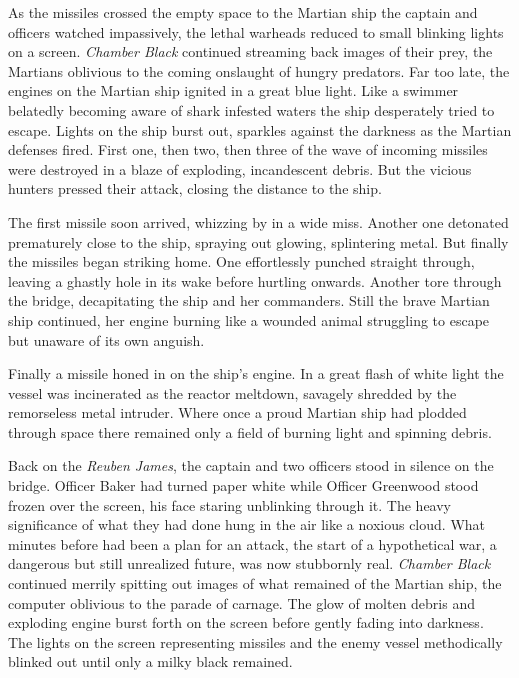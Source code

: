 \documentclass[openany, 12pt]{book} %
\begin{document}
As the missiles crossed the empty space to the Martian ship the captain and officers watched impassively, the lethal warheads reduced to small blinking lights on a screen. \textit{Chamber Black} continued streaming back images of their prey, the Martians oblivious to the coming onslaught of hungry predators. Far too late, the engines on the Martian ship ignited in a great blue light. Like a swimmer belatedly becoming aware of shark infested waters the ship desperately tried to escape. Lights on the ship burst out, sparkles against the darkness as the Martian defenses fired. First one, then two, then three of the wave of incoming missiles were destroyed in a blaze of exploding, incandescent debris. But the vicious hunters pressed their attack, closing the distance to the ship.

The first missile soon arrived, whizzing by in a wide miss. Another one detonated prematurely close to the ship, spraying out glowing, splintering metal. But finally the missiles began striking home. One effortlessly punched straight through, leaving a ghastly hole in its wake before hurtling onwards. Another tore through the bridge, decapitating the ship and her commanders. Still the brave Martian ship continued, her engine burning like a wounded animal struggling to escape but unaware of its own anguish.

Finally a missile honed in on the ship's engine. In a great flash of white light the vessel was incinerated as the reactor meltdown, savagely shredded by the remorseless metal intruder. Where once a proud Martian ship had plodded through space there remained only a field of burning light and spinning debris.

Back on the \textit{Reuben James}, the captain and two officers stood in silence on the bridge. Officer Baker had turned paper white while Officer Greenwood stood frozen over the screen, his face staring unblinking through it. The heavy significance of what they had done hung in the air like a noxious cloud. What minutes before had been a plan for an attack, the start of a hypothetical war, a dangerous but still unrealized future, was now stubbornly real. \textit{Chamber Black} continued merrily spitting out images of what remained of the Martian ship, the computer oblivious to the parade of carnage. The glow of molten debris and exploding engine burst forth on the screen before gently fading into darkness. The lights on the screen representing missiles and the enemy vessel methodically blinked out until only a milky black remained.
\end{document}
